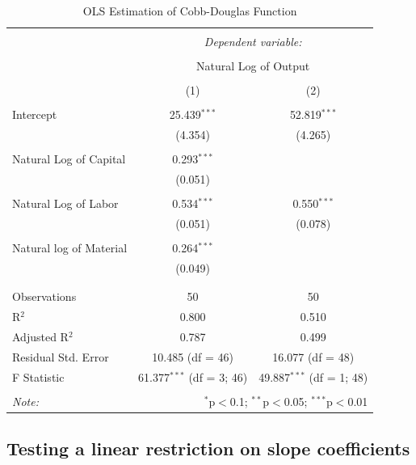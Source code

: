 \documentclass[
]{book}
\theoremstyle{definition}
\theoremstyle{definition}
\theoremstyle{definition}
\theoremstyle{definition}
\theoremstyle{remark}
\begin{document}
\begin{table}[!htbp] \centering 
  \caption{OLS Estimation of Cobb-Douglas Function} 
  \label{} 
\begin{tabular}{@{\extracolsep{5pt}}lcc} 
\\[-1.8ex]\hline 
\hline \\[-1.8ex] 
 & \multicolumn{2}{c}{\textit{Dependent variable:}} \\ 
\cline{2-3} 
\\[-1.8ex] & \multicolumn{2}{c}{Natural Log of Output} \\ 
\\[-1.8ex] & (1) & (2)\\ 
\hline \\[-1.8ex] 
 Intercept & 25.439$^{***}$ & 52.819$^{***}$ \\ 
  & (4.354) & (4.265) \\ 
  & & \\ 
 Natural Log of Capital & 0.293$^{***}$ &  \\ 
  & (0.051) &  \\ 
  & & \\ 
 Natural Log of Labor & 0.534$^{***}$ & 0.550$^{***}$ \\ 
  & (0.051) & (0.078) \\ 
  & & \\ 
 Natural log of Material & 0.264$^{***}$ &  \\ 
  & (0.049) &  \\ 
  & & \\ 
\hline \\[-1.8ex] 
Observations & 50 & 50 \\ 
R$^{2}$ & 0.800 & 0.510 \\ 
Adjusted R$^{2}$ & 0.787 & 0.499 \\ 
Residual Std. Error & 10.485 (df = 46) & 16.077 (df = 48) \\ 
F Statistic & 61.377$^{***}$ (df = 3; 46) & 49.887$^{***}$ (df = 1; 48) \\ 
\hline 
\hline \\[-1.8ex] 
\textit{Note:}  & \multicolumn{2}{r}{$^{*}$p$<$0.1; $^{**}$p$<$0.05; $^{***}$p$<$0.01} \\ 
\end{tabular} 
\end{table}

\hypertarget{testing-a-linear-restriction-on-slope-coefficients}{%
\subsection{Testing a linear restriction on slope coefficients}\label{testing-a-linear-restriction-on-slope-coefficients}}
\end{document}
